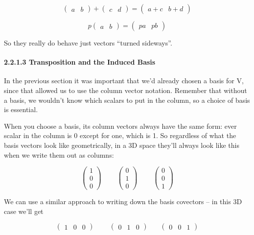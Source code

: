 \documentclass[oneside,english]{amsbook}
\numberwithin{section}{chapter}
\theoremstyle{plain}
\theoremstyle{definition}
\begin{document}
\[\begin{pmatrix}
	a & b
\end{pmatrix} + \begin{pmatrix}
	c & d
\end{pmatrix} = \begin{pmatrix}
	a + c & b + d
\end{pmatrix}\]

\[p\begin{pmatrix}
	a & b
\end{pmatrix} = \begin{pmatrix}
	pa & pb
\end{pmatrix}\]

So they really do behave just vectors ``turned sideways''.

\paragraph{2.2.1.3 Transposition and the Induced
	Basis}\label{transposition-and-the-induced-basis}

In the previous section it was important that we'd already chosen a
basis for V, since that allowed us to use the column vector notation.
Remember that without a basis, we wouldn't know which scalars to put in
the column, so a choice of basis is essential.

When you choose a basis, its column vectors always have the same form:
ever scalar in the column is 0 except for one, which is 1. So regardless
of what the basis vectors look like geometrically, in a 3D space they'll
always look like this when we write them out as columns:

\[\begin{pmatrix}
	1 \\
	0 \\
	0
\end{pmatrix}\ \ \ \ \ \ \ \ \ \ \begin{pmatrix}
	0 \\
	1 \\
	0
\end{pmatrix}\ \ \ \ \ \ \ \ \ \ \begin{pmatrix}
	0 \\
	0 \\
	1
\end{pmatrix}\]

We can use a similar approach to writing down the basis covectors -- in
this 3D case we'll get

\[\begin{pmatrix}
	1 & 0 & 0
\end{pmatrix}\ \ \ \ \ \ \ \ \ \ \begin{pmatrix}
	0 & 1 & 0
\end{pmatrix}\ \ \ \ \ \ \ \ \begin{pmatrix}
	0 & 0 & 1
\end{pmatrix}\]
\end{document}
